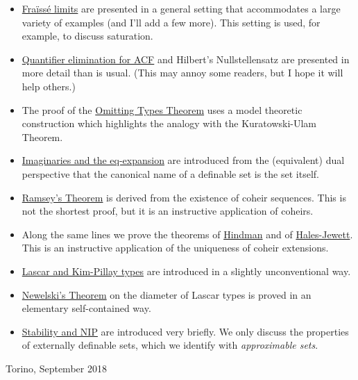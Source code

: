 \documentclass[creche.tex]{subfiles}
\begin{document}
\begin{itemize}
\item \hyperref[rich]{Fraïssé limits} are presented in a general setting that accommodates a large variety of examples (and I'll add a few more).
This setting is used, for example, to discuss saturation.
\item \hyperref[algebraic]{Quantifier elimination for ACF} and Hilbert's Nullstellensatz are presented in more detail than is usual.
(This may annoy some readers, but I hope it will help others.)
\item The proof of the \hyperref[countable]{Omitting Types Theorem} uses a model theoretic construction which highlights the analogy with the Kuratowski-Ulam Theorem.
\item \hyperref[imaginary]{Imaginaries and the eq-expansion} are introduced from the (equivalent) dual perspective that the canonical name of a definable set is the set itself.
\item \hyperref[Ramsey]{Ramsey's Theorem} is derived from the existence of coheir sequences.
This is not the shortest proof, but it is an instructive application of coheirs.
\item Along the same lines we prove the theorems of \hyperref[Hindman]{Hindman} and of \hyperref[HJ]{Hales-Jewett}. This is an instructive application of the uniqueness of coheir extensions.
\item \hyperref[invariantL]{Lascar and Kim-Pillay types} are introduced in a slightly unconventional way.
\item \hyperref[newelski]{Newelski's Theorem\/} on the diameter of Lascar types is proved in an elementary self-contained way.
\item  \hyperref[external]{Stability and NIP\/} are introduced very briefly.
We only discuss the properties of externally definable sets, which we identify with \textit{approximable sets}.
\end{itemize}

\bigskip\bigskip
\hfill Torino, September 2018
\end{document}
